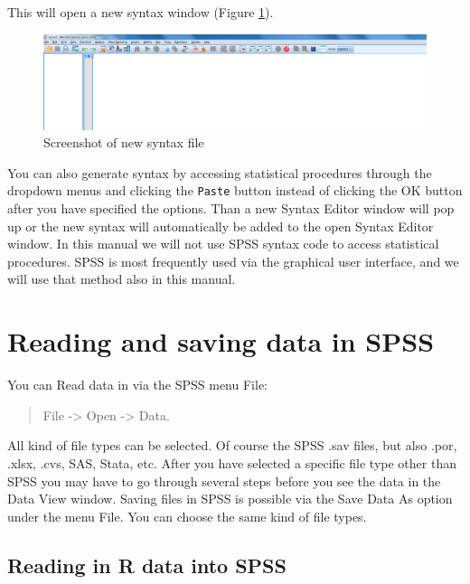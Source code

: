 \documentclass[
]{book}
\begin{document}
This will open a new syntax window (Figure \ref{fig:fig6}).

\begin{figure}

{\centering \includegraphics[width=0.95\linewidth]{images/fig1.6} 

}

\caption{Screenshot of new syntax file}\label{fig:fig6}
\end{figure}

You can also generate syntax by accessing statistical procedures through the dropdown menus and clicking the \texttt{Paste} button instead of clicking the OK button after you have specified the options. Than a new Syntax Editor window will pop up or the new syntax will automatically be added to the open Syntax Editor window. In this manual we will not use SPSS syntax code to access statistical procedures. SPSS is most frequently used via the graphical user interface, and we will use that method also in this manual.

\hypertarget{reading-and-saving-data-in-spss}{%
\section{Reading and saving data in SPSS}\label{reading-and-saving-data-in-spss}}

You can Read data in via the SPSS menu File:

\begin{quote}
File -\textgreater{} Open -\textgreater{} Data.
\end{quote}

All kind of file types can be selected. Of course the SPSS .sav files, but also .por, .xlsx, .cvs, SAS, Stata, etc. After you have selected a specific file type other than SPSS you may have to go through several steps before you see the data in the Data View window. Saving files in SPSS is possible via the Save Data As option under the menu File. You can choose the same kind of file types.

\hypertarget{reading-in-r-data-into-spss}{%
\subsection{Reading in R data into SPSS}\label{reading-in-r-data-into-spss}}
\end{document}
